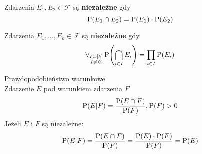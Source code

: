\begin{definition} Zdarzenia \(E_1, E_2 \in \mathcal{F}\) są \textbf{niezależne} gdy
	\[
		\operatorname{P}(E_1 \cap E_2) = \operatorname{P}(E_1) \cdot \operatorname{P}(E_2)
	\]
\end{definition}

\begin{definition} Zdarzenia \(E_1, ..., E_k \in \mathcal{F}\) są \textbf{niezależne} gdy
	\[
		\forall_{\substack{I \subseteq [k] \\ I \ne \emptyset}} \prob\pars{\bigcap_{i \in I} E_i} = \prod_{i \in I} \prob(E_i)
	\]
\end{definition}

\begin{definition} Prawdopodobieństwo warunkowe \\
	Zdarzenie \(E\) pod warunkiem zdarzenia \(F\)
	\[
		\operatorname{P}(E|F) = \frac{\operatorname{P}(E \cap F)}{\operatorname{P}(F)}, \operatorname{P}(F) > 0
	\]
	Jeżeli \(E\) i \(F\) są niezależne:
	\[
		\operatorname{P}(E|F) = \frac{\operatorname{P}(E \cap F)}{\operatorname{P}(F)} = \frac{\operatorname{P}(E)\cdot \operatorname{P}(F)}{\operatorname{P}(F)} = \operatorname{P}(E)
	\]
\end{definition}
